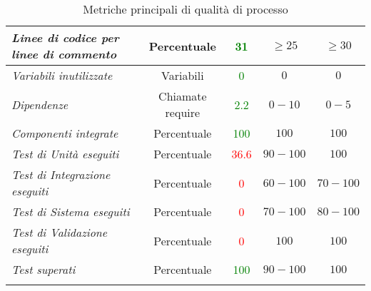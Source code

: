 \begin{longtable}{|>{\centering}m{5cm}|c|c|c|c|}
\emph{Linee di codice per linee di commento} & {Percentuale} & \textcolor{Green}{31} & $\geq 25$ & $\geq 30$\\ \hline
\emph{Variabili inutilizzate} & {Variabili} & \textcolor{Green}{0} & $0$ & $0$\\ \hline
\emph{Dipendenze} & {Chiamate require} & \textcolor{Green}{2.2} & $0 - 10$ & $0 - 5$\\ \hline
\emph{Componenti integrate} & {Percentuale} & \textcolor{Green}{100} & $100$ & $100$\\ \hline
\emph{Test di Unità eseguiti} & {Percentuale} & \textcolor{Red}{36.6} & $90 - 100$ & $100$\\ \hline
\emph{Test di Integrazione eseguiti} & {Percentuale} & \textcolor{Red}{0} & $60 - 100$ & $70 - 100$\\ \hline
\emph{Test di Sistema eseguiti} & {Percentuale} & \textcolor{Red}{0} & $70 - 100$ & $80 - 100$\\ \hline
\emph{Test di Validazione eseguiti} & {Percentuale} & \textcolor{Red}{0} & $100$ & $100$\\ \hline
\emph{Test superati} & {Percentuale} & \textcolor{Green}{100} & $90 - 100$ & $100$\\ \hline
\caption{Metriche principali di qualità di processo}
\end{longtable}

\newpage

